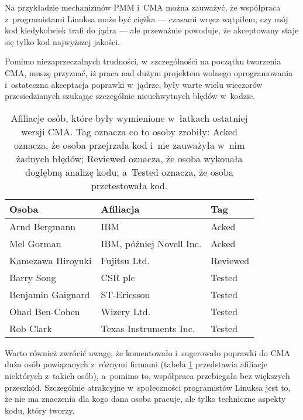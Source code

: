 Na przykładzie mechanizmów PMM i~CMA można zauważyć, że współpraca
z~programistami Linuksa może być ciężka --- czasami wręcz wątpiłem, czy
mój kod kiedykolwiek trafi do jądra --- ale przeważnie powoduje, że
akceptowany staje się tylko kod najwyższej jakości.

Pomimo niezaprzeczalnych trudności, w~szczególności na początku
tworzenia CMA, muszę przyznać, iż praca nad dużym projektem wolnego
oprogramowania i~ostateczna akceptacja poprawki w~jądrze, były warte
wielu wieczorów przesiedzianych szukając szczególnie nieuchwytnych
blędów w~kodzie.

\begin{table}[htbp]
\begin{center}
\begin{tabular}{lll}
Osoba             & Afiliacja                & Tag \\
\hline
Arnd Bergmann     & IBM                      & Acked \\
Mel Gorman        & IBM, później Novell Inc. & Acked \\
Kamezawa Hiroyuki & Fujitsu Ltd.             & Reviewed \\
Barry Song        & CSR plc                  & Tested \\
Benjamin Gaignard & ST-Ericsson              & Tested \\
Ohad Ben-Cohen    & Wizery Ltd.              & Tested \\
Rob Clark         & Texas Instruments Inc.   & Tested \\
\end{tabular}
\end{center}
\caption{Afiliacje osób, które były wymienione w~łatkach ostatniej
  wersji CMA.  Tag oznacza co to osoby zrobiły: Acked oznacza, że
  osoba przejrzała kod i~nie zauważyła w~nim żadnych błędów; Reviewed
  oznacza, że osoba wykonała dogłębną analizę kodu; a~Tested oznacza,
  że osoba przetestowała kod.}
\label{tab:cma-ppl}
\end{table}

Warto również zwrócić uwagę, że komentowało i~sugerowało poprawki do
CMA dużo osób powiązanych z~różnymi firmami (tabela \ref{tab:cma-ppl}
przedstawia afiliacje niektórych z~takich osób), a~pomimo to,
współpraca przebiegała bez większych przeszkód.  Szczególnie
atrakcyjne w~społeczności programistów Linuksa jest to, że nie ma
znaczenia dla kogo dana osoba pracuje, ale tylko techniczne aspekty
kodu, który tworzy.
